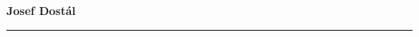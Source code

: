 \documentclass{article}
\begin{document}
\begin{center}
	\Huge{\textbf{Josef Dostál}}

	\par\noindent\rule{\textwidth}{0.4pt}
\end{center}
\end{document}
